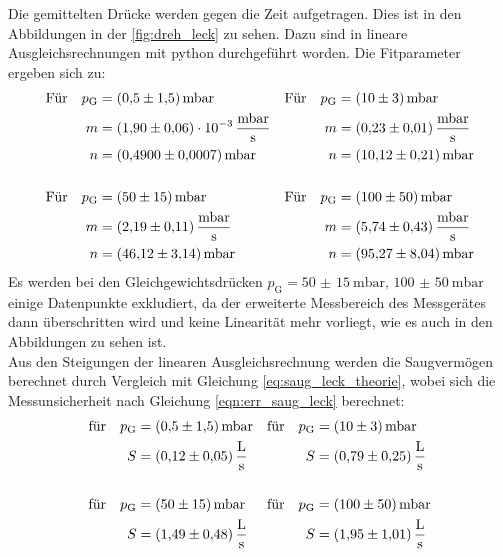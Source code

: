     \noindent Die gemittelten Drücke werden gegen die Zeit aufgetragen. Dies ist in den Abbildungen in der \autoref{fig:dreh_leck} zu sehen. Dazu sind in lineare Ausgleichsrechnungen 
    mit python \cite{scipy} durchgeführt worden. Die Fitparameter ergeben sich zu:
    \begin{align*}
      \text{Für} \quad  p_\text{G} &= \SI{0.5(15)}{\milli\bar}  & \text{Für} \quad  p_\text{G} &= \SI{10(3)}{\milli\bar}\\
      m &= \SI{1.90(6)e-3}{\milli\bar\per\second}           & m &= \SI{0.23 \pm 0.01}{\milli\bar\per\second} \\
      n &= \SI{0.49 \pm 0.0007}{\milli\bar}                 & n &= \SI{10.12 \pm 0.21}{\milli\bar} \\
      \\
      \text{Für} \quad  p_\text{G} &= \SI{50(15)}{\milli\bar}   & \text{Für} \quad  p_\text{G} &= \SI{100(50)}{\milli\bar}\\
      m &= \SI{2.19 \pm 0.11}{\milli\bar\per\second}        & m &= \SI{5.74 \pm 0.43}{\milli\bar\per\second} \\
      n &= \SI{46.12 \pm 3.14}{\milli\bar}                  & n &= \SI{95.27 \pm 8.04}{\milli\bar} 
    \end{align*}
    Es werden bei den Gleichgewichtsdrücken $p_\text{G} = \SI{50(15)}{\milli\bar}, \, \SI{100(50)}{\milli\bar}$ einige Datenpunkte exkludiert, da der erweiterte Messbereich des Messgerätes
    dann überschritten wird und keine Linearität mehr vorliegt, wie es auch in den Abbildungen zu sehen ist. \\
    Aus den Steigungen der linearen Ausgleichsrechnung werden die Saugvermögen berechnet durch Vergleich mit Gleichung \eqref{eq:saug_leck_theorie}, wobei sich die Messunsicherheit nach Gleichung \eqref{eqn:err_saug_leck} berechnet:
    \begin{align*}
      \text{für} \quad p_\text{G} &= \SI{0.5(15)}{\milli\bar} & \text{für} \quad p_\text{G} &= \SI{10(3)}{\milli\bar} \\
      S &= \SI{0.12 \pm 0.05}{\litre\per\second}               & S &= \SI{0.79 \pm 0.25}{\litre\per\second}  \\
      \\
      \text{für} \quad p_\text{G} &= \SI{50(15)}{\milli\bar}  & \text{für} \quad p_\text{G} &= \SI{100(50)}{\milli\bar} \\
      S &= \SI{1.49 \pm 0.48}{\litre\per\second}               & S &= \SI{1.95 \pm 1.01}{\litre\per\second}  
    \end{align*}

